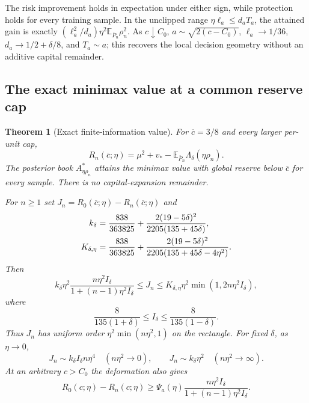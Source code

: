 \documentclass[11pt,a4paper]{amsart}
\theoremstyle{plain}
\newtheorem{theorem}{Theorem}[section]
\theoremstyle{definition}
\theoremstyle{remark}
\newcommand{\EE}{\mathbb{E}}
\newcommand{\Ebar}{\EE_{\overline P_n}}
\begin{document}
The risk improvement holds in expectation under either sign, while protection holds for every training sample. In the unclipped range $\eta\ell_a\le d_aT_a$, the attained gain is exactly $(\ell_a^2/d_a)\eta^2\Ebar\rho_n^2$. As $c\downarrow C_0$, $a\sim\sqrt{2(c-C_0)}$, $\ell_a\to1/36$, $d_a\to1/2+\delta/8$, and $T_a\sim a$; this recovers the local decision geometry without an additive capital remainder.

\subsection{The exact minimax value at a common reserve cap}

\begin{theorem}[Exact finite-information value]\label{thm:exactstat}
For $\overline c=3/8$ and every larger per-unit cap,
\begin{equation}\label{eq:exactstatvalue}
 R_n(\overline c;\eta)=\mu^2+v_*-\Ebar\Lambda_\delta(\eta\rho_n).
\end{equation}
The posterior book $A_{\eta\rho_n}^*$ attains the minimax value with global reserve below $\overline c$ for every sample. There is no capital-expansion remainder.

For $n\ge1$ set $J_n=R_0(\overline c;\eta)-R_n(\overline c;\eta)$ and
\begin{align}\label{eq:rateconstants}
 k_\delta&=\frac{838}{363825}
 +\frac{2(19-5\delta)^2}{2205(135+45\delta)},\notag\\
 K_{\delta,\eta}&=\frac{838}{363825}
 +\frac{2(19-5\delta)^2}{2205(135+45\delta-4\eta^2)}.
\end{align}
Then
\begin{equation}\label{eq:allnrates}
 k_\delta\eta^2\frac{n\eta^2 I_\delta}{1+(n-1)\eta^2 I_\delta}
 \le J_n\le K_{\delta,\eta}\eta^2\min(1,2n\eta^2 I_\delta),
\end{equation}
where
\begin{equation}\label{eq:informationbounds}
 \frac8{135(1+\delta)}\le I_\delta\le\frac8{135(1-\delta)}.
\end{equation}
Thus $J_n$ has uniform order $\eta^2\min(n\eta^2,1)$ on the rectangle. For fixed $\delta$, as $\eta\to0$,
\begin{equation}\label{eq:exactsiglimits}
 J_n\sim k_\delta I_\delta n\eta^4\quad(n\eta^2\to0),\qquad
 J_n\sim k_\delta\eta^2\quad(n\eta^2\to\infty).
\end{equation}
At an arbitrary $c>C_0$ the deformation also gives
\begin{equation}\label{eq:arbitrarycaprate}
 R_0(c;\eta)-R_n(c;\eta)\ge
 \Psi_a(\eta)\frac{n\eta^2 I_\delta}{1+(n-1)\eta^2 I_\delta}.
\end{equation}
\end{theorem}
\end{document}
